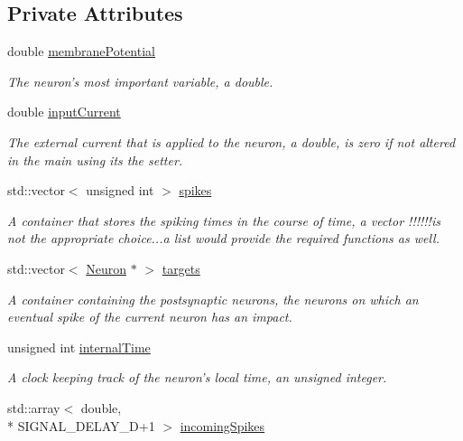 \subsection*{Private Attributes}
\begin{DoxyCompactItemize}
\item 
\hypertarget{classNeuron_a311f3321f19462c0aef8cbd68c60df67}{double \hyperlink{classNeuron_a311f3321f19462c0aef8cbd68c60df67}{membrane\-Potential}}\label{classNeuron_a311f3321f19462c0aef8cbd68c60df67}

\begin{DoxyCompactList}\small\item\em The neuron's most important variable, a double. \end{DoxyCompactList}\item 
\hypertarget{classNeuron_a50505e8dcb655170bfc9562465fd907f}{double \hyperlink{classNeuron_a50505e8dcb655170bfc9562465fd907f}{input\-Current}}\label{classNeuron_a50505e8dcb655170bfc9562465fd907f}

\begin{DoxyCompactList}\small\item\em The external current that is applied to the neuron, a double, is zero if not altered in the main using its the setter. \end{DoxyCompactList}\item 
\hypertarget{classNeuron_ab358994e1a6e4d3a1399906471657b4b}{std\-::vector$<$ unsigned int $>$ \hyperlink{classNeuron_ab358994e1a6e4d3a1399906471657b4b}{spikes}}\label{classNeuron_ab358994e1a6e4d3a1399906471657b4b}

\begin{DoxyCompactList}\small\item\em A container that stores the spiking times in the course of time, a vector !!!!!!is not the appropriate choice...a list would provide the required functions as well. \end{DoxyCompactList}\item 
\hypertarget{classNeuron_a5c97843cd38dd8c5ff2d861d25e18473}{std\-::vector$<$ \hyperlink{classNeuron}{Neuron} $\ast$ $>$ \hyperlink{classNeuron_a5c97843cd38dd8c5ff2d861d25e18473}{targets}}\label{classNeuron_a5c97843cd38dd8c5ff2d861d25e18473}

\begin{DoxyCompactList}\small\item\em A container containing the postsynaptic neurons, the neurons on which an eventual spike of the current neuron has an impact. \end{DoxyCompactList}\item 
unsigned int \hyperlink{classNeuron_adb1a016b5d339ba3ba95367bb66f391a}{internal\-Time}
\begin{DoxyCompactList}\small\item\em A clock keeping track of the neuron's local time, an unsigned integer. \end{DoxyCompactList}\item 
std\-::array$<$ double, \\*
S\-I\-G\-N\-A\-L\-\_\-\-D\-E\-L\-A\-Y\-\_\-\-D+1 $>$ \hyperlink{classNeuron_a15160c28823ad0e63f171af31fd6b1ea}{incoming\-Spikes}
\end{DoxyCompactItemize}


